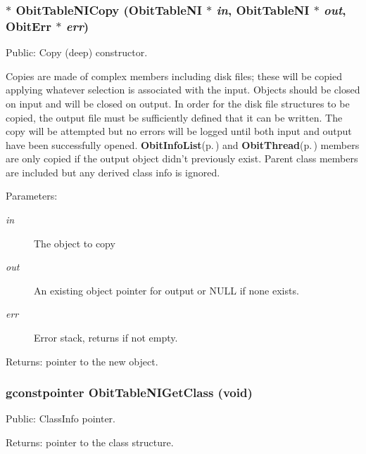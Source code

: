 \subsubsection{$\ast$ Obit\-Table\-NICopy ({\bf Obit\-Table\-NI} $\ast$ {\em in}, {\bf Obit\-Table\-NI} $\ast$ {\em out}, {\bf Obit\-Err} $\ast$ {\em err})}\label{ObitTableNI_8c_a20}


Public: Copy (deep) constructor. 

Copies are made of complex members including disk files; these will be copied applying whatever selection is associated with the input. Objects should be closed on input and will be closed on output. In order for the disk file structures to be copied, the output file must be sufficiently defined that it can be written. The copy will be attempted but no errors will be logged until both input and output have been successfully opened. {\bf Obit\-Info\-List}{\rm (p.\,\pageref{structObitInfoList})} and {\bf Obit\-Thread}{\rm (p.\,\pageref{structObitThread})} members are only copied if the output object didn't previously exist. Parent class members are included but any derived class info is ignored. \begin{Desc}
\item[Parameters:]
\begin{description}
\item[{\em in}]The object to copy \item[{\em out}]An existing object pointer for output or NULL if none exists. \item[{\em err}]Error stack, returns if not empty. \end{description}
\end{Desc}
\begin{Desc}
\item[Returns:]pointer to the new object. \end{Desc}
\subsubsection{\setlength{\rightskip}{0pt plus 5cm}gconstpointer Obit\-Table\-NIGet\-Class (void)}\label{ObitTableNI_8c_a17}


Public: Class\-Info pointer. 

\begin{Desc}
\item[Returns:]pointer to the class structure. \end{Desc}
